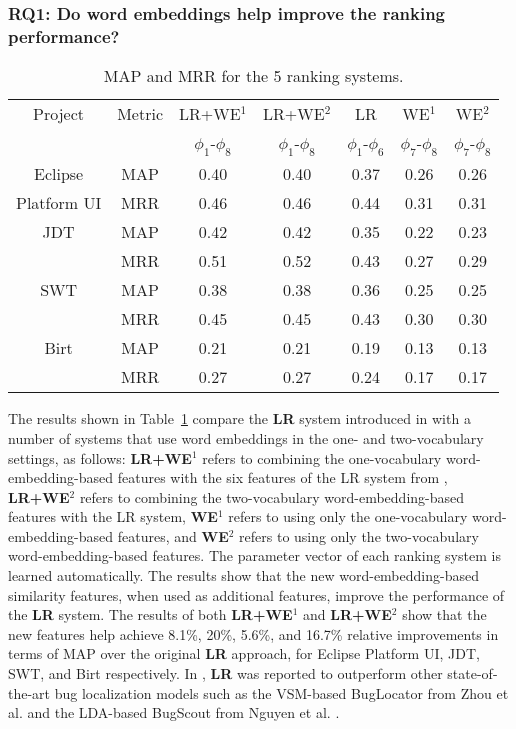 \subsubsection{\textbf{RQ1:} Do word embeddings help improve the ranking performance?}
\label{sec:evaluation:rq1}

\begin{table}[t]
\centering
\caption{MAP and MRR for the 5 ranking systems.}
\begin{adjustbox}{width=0.47\textwidth}
\begin{tabular}{|c|c|c|c|c|c|c|} \hline
Project & Metric & LR+WE$^1$ & LR+WE$^2$ & LR & WE$^1$ & WE$^2$\\
& & $\phi_1$-$\phi_8$ & $\phi_1$-$\phi_8$ & $\phi_1$-$\phi_6$ & $\phi_7$-$\phi_8$ &$\phi_7$-$\phi_8$ \\ \hline
Eclipse & MAP & 0.40 & 0.40 & 0.37 & 0.26 & 0.26\\
Platform UI& MRR & 0.46 & 0.46 & 0.44 & 0.31 & 0.31\\ \hline
JDT& MAP & 0.42 & 0.42 & 0.35 & 0.22 & 0.23\\
& MRR & 0.51 & 0.52 & 0.43 & 0.27 & 0.29\\ \hline
SWT& MAP & 0.38 & 0.38 & 0.36 & 0.25 & 0.25\\
& MRR & 0.45 & 0.45 & 0.43 & 0.30 & 0.30\\ \hline
Birt& MAP & 0.21 & 0.21 & 0.19 & 0.13 & 0.13\\
& MRR & 0.27 & 0.27 & 0.24 & 0.17 & 0.17\\ \hline
\end{tabular}
\end{adjustbox}
\label{tab:comparison}
\end{table}

The results shown in Table~\ref{tab:comparison} compare the \textbf{LR} system introduced in  \cite{ye:fse14} with a number of systems that use word embeddings in the one- and two-vocabulary settings, as follows: \textbf{LR+WE$^1$} refers to combining the one-vocabulary word-embedding-based features with the six features of the LR system from \cite{ye:fse14}, \textbf{LR+WE$^2$} refers to combining the two-vocabulary word-embedding-based features with the LR system, \textbf{WE$^1$} refers to using only the one-vocabulary word-embedding-based features, and \textbf{WE$^2$} refers to using only the two-vocabulary word-embedding-based features. The parameter vector of each ranking system is learned automatically. The results show that the new word-embedding-based similarity features, when used as additional features, improve the performance of the \textbf{LR} system. The results of both \textbf{LR+WE$^1$} and \textbf{LR+WE$^2$} show that the new features help achieve 8.1\%, 20\%, 5.6\%, and 16.7\% relative improvements in terms of MAP over the original \textbf{LR} approach, for Eclipse Platform UI, JDT, SWT, and Birt respectively. In \cite{ye:fse14}, \textbf{LR} was reported to outperform other state-of-the-art bug localization models such as the VSM-based BugLocator from Zhou et al. \cite{Zhou:2012:BFM:2337223.2337226} and the LDA-based BugScout from Nguyen et al. \cite{Nguyen:2011:TAN:2190078.2190181}.

